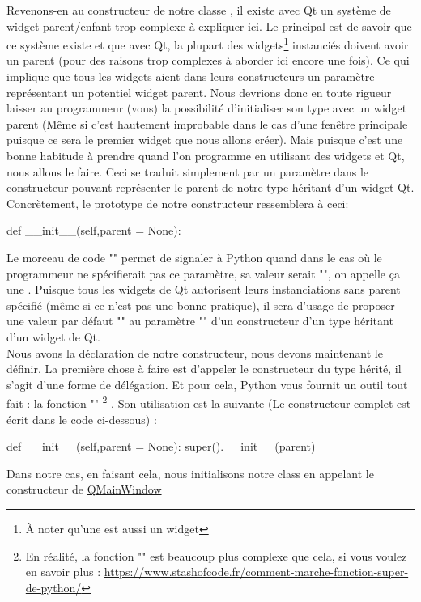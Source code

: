 Revenons-en au constructeur de notre classe , il existe avec Qt un système de widget parent/enfant trop complexe à expliquer ici. Le principal est de savoir que ce système existe et que avec Qt, la plupart des widgets\footnote{À noter qu'une  est aussi un widget} instanciés doivent avoir un parent (pour des raisons trop complexes à aborder ici encore une fois). Ce qui implique que tous les widgets aient dans leurs constructeurs un paramètre représentant un potentiel widget parent.\vskip 0cm %
Nous devrions donc en toute rigueur laisser au programmeur (vous) la possibilité d'initialiser son type avec un widget parent (Même si c'est hautement improbable dans le cas d'une fenêtre principale puisque ce sera le premier widget que nous allons créer). Mais puisque c'est une bonne habitude à prendre quand l'on programme en utilisant des widgets et Qt, nous allons le faire.\newline
Ceci se traduit simplement par un paramètre  dans le constructeur pouvant représenter le parent de notre type héritant d'un widget Qt.\newline
Concrètement, le prototype de notre constructeur ressemblera à ceci:
\begin{Python}
def __init__(self,parent = None):
\end{Python}
Le morceau de code "" permet de signaler à Python quand dans le cas où le programmeur ne spécifierait pas ce paramètre, sa valeur serait "", on appelle ça une .\newline
Puisque tous les widgets de Qt autorisent leurs instanciations sans parent spécifié (même si ce n'est pas une bonne pratique), il sera d'usage de proposer une valeur par défaut "" au paramètre "" d'un constructeur d'un type héritant d'un widget de Qt.\\

Nous avons la déclaration de notre constructeur, nous devons maintenant le définir.\newline
La première chose à faire est d'appeler le constructeur du type hérité, il s'agit d'une forme de délégation. Et pour cela, Python vous fournit un outil tout fait : la fonction ""
\footnote
{En réalité, la fonction "" est beaucoup plus complexe que cela, si vous voulez en savoir plus : \url{https://www.stashofcode.fr/comment-marche-fonction-super-de-python/}}
. Son utilisation est la suivante (Le constructeur complet est écrit dans le code ci-dessous) :
\begin{Python}
def __init__(self,parent = None):
		super().__init__(parent)
\end{Python}
Dans notre cas, en faisant cela, nous initialisons notre class en appelant le constructeur de \href{https://doc.qt.io/qt-5/qmainwindow.html}{QMainWindow}\newpage


